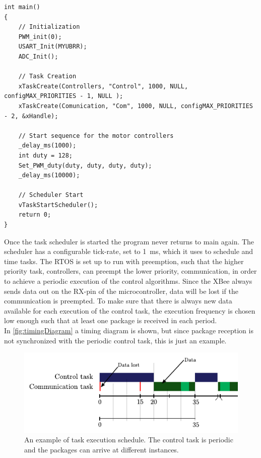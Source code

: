 \begin{lstlisting}[style=customcpp,
                    caption={Code for initialization, creation of the different tasks, start sequence for the motors and call to the scheduler.}, 
                    label=lst:scheduler]
int main()
{
    // Initialization
    PWM_init(0);
    USART_Init(MYUBRR);
    ADC_Init();
    
    // Task Creation
    xTaskCreate(Controllers, "Control", 1000, NULL, configMAX_PRIORITIES - 1, NULL );
    xTaskCreate(Comunication, "Com", 1000, NULL, configMAX_PRIORITIES - 2, &xHandle);
    
    // Start sequence for the motor controllers
    _delay_ms(1000);
    int duty = 128;
    Set_PWM_duty(duty, duty, duty, duty);
    _delay_ms(10000);
 
    // Scheduler Start
    vTaskStartScheduler();
    return 0;
}
\end{lstlisting}

Once the task scheduler is started the program never returns to main again. The scheduler has a configurable tick-rate, set to \SI{1}{ms}, which it uses to schedule and time tasks. The RTOS is set up to run with preemption, such that the higher priority task, controllers, can preempt the lower priority, communication, in order to achieve a periodic execution of the control algorithms. Since the XBee always sends data out on the RX-pin of the microcontroller, data will be lost if the communication is preempted. To make sure that there is always new data available for each execution of the control task, the execution frequency is chosen low enough such that at least one package is received in each period.\\
In \autoref{fig:timingDiagram} a timing diagram is shown, but since package reception is not synchronized with the periodic control task, this is just an example.

\begin{figure}[H]
    \includegraphics[width =.7\textwidth]{figures/timingDiagram}
    \centering			
    \caption{An example of task execution schedule. The control task is periodic and the packages can arrive at different instances.} 
    \label{fig:timingDiagram}
\end{figure}

